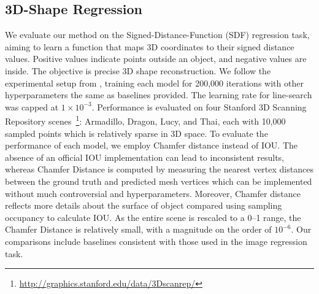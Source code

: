\subsection{3D-Shape Regression}
\begin{table*}[!ht]
    \centering
    \caption{We highlight the best results in bold and underline the second-best results. Since the space is normalized, the detail difference will be extremely small in scale ($10^{-6}$) and the main structure is fitted well. However, the actual fitted result is quite different in details. Therefore, we also provide figures (\autoref{figure:exp_sdf}) of the performance to have a better understanding of the performance.}
    \label{table:metrics_comparison}
 \vspace{-10pt}
\end{table*}
 We evaluate our method on the Signed-Distance-Function (SDF) regression task, aiming to learn a function that maps 3D coordinates to their signed distance values. Positive values indicate points outside an object, and negative values are inside.
%
The objective is precise 3D shape reconstruction. We follow the experimental setup from \citet{lindell2022bacon}, training each model for 200,000 iterations with other hyperparameters the same as baselines provided. The learning rate for line-search was capped at $1 \times 10^{-3}$.
%
Performance is evaluated on four Stanford 3D Scanning Repository scenes~\footnote{\url{http://graphics.stanford.edu/data/3Dscanrep/}}: Armadillo, Dragon, Lucy, and Thai, each with 10,000 sampled points which is relatively sparse in 3D space.
%
To evaluate the performance of each model, we employ Chamfer distance instead of IOU. The absence of an official IOU implementation can lead to inconsistent results, whereas Chamfer Distance is computed by measuring the nearest vertex distances between the ground truth and predicted mesh vertices which can be implemented without much controversial and hyperparameters. Moreover, Chamfer distance reflects more details about the surface of object compared using sampling occupancy to calculate IOU. As the entire scene is rescaled to a 0–1 range, the Chamfer Distance is relatively small, with a magnitude on the order of \(10^{-6}\).
%
Our comparisons include baselines consistent with those used in the image regression task.

